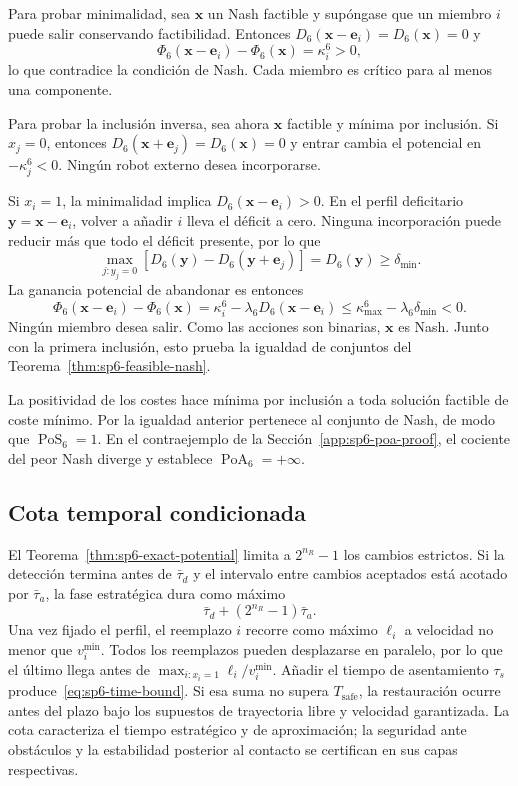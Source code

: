 Para probar minimalidad, sea $\boldsymbol x$ un Nash factible y supóngase que un miembro $i$ puede salir conservando factibilidad. Entonces
$D_6(\boldsymbol x-\boldsymbol e_i)=D_6(\boldsymbol x)=0$ y
\[
 \Phi_6(\boldsymbol x-\boldsymbol e_i)-\Phi_6(\boldsymbol x)=\kappa_i^6>0,
\]
lo que contradice la condición de Nash. Cada miembro es crítico para al menos una componente.

Para probar la inclusión inversa, sea ahora $\boldsymbol x$ factible y mínima por inclusión. Si $x_j=0$, entonces $D_6(\boldsymbol x+\boldsymbol e_j)=D_6(\boldsymbol x)=0$ y entrar cambia el potencial en $-\kappa_j^6<0$. Ningún robot externo desea incorporarse.

Si $x_i=1$, la minimalidad implica $D_6(\boldsymbol x-\boldsymbol e_i)>0$. En el perfil deficitario $\boldsymbol y=\boldsymbol x-\boldsymbol e_i$, volver a añadir $i$ lleva el déficit a cero. Ninguna incorporación puede reducir más que todo el déficit presente, por lo que
\[
 \max_{j:y_j=0}\left[D_6(\boldsymbol y)-D_6(\boldsymbol y+\boldsymbol e_j)\right]
 =D_6(\boldsymbol y)\geq\delta_{\min}.
\]
La ganancia potencial de abandonar es entonces
\[
 \Phi_6(\boldsymbol x-\boldsymbol e_i)-\Phi_6(\boldsymbol x)
 =\kappa_i^6-\lambda_6D_6(\boldsymbol x-\boldsymbol e_i)
 \leq\kappa_{\max}^6-\lambda_6\delta_{\min}<0.
\]
Ningún miembro desea salir. Como las acciones son binarias, $\boldsymbol x$ es Nash. Junto con la primera inclusión, esto prueba la igualdad de conjuntos del Teorema~\ref{thm:sp6-feasible-nash}.

La positividad de los costes hace mínima por inclusión a toda solución factible de coste mínimo. Por la igualdad anterior pertenece al conjunto de Nash, de modo que $\operatorname{PoS}_6=1$. En el contraejemplo de la Sección~\ref{app:sp6-poa-proof}, el cociente del peor Nash diverge y establece $\operatorname{PoA}_6=+\infty$.

\subsection{Cota temporal condicionada}
\label{app:sp6-time-proof}

El Teorema~\ref{thm:sp6-exact-potential} limita a $2^{n_R}-1$ los cambios estrictos. Si la detección termina antes de $\bar\tau_d$ y el intervalo entre cambios aceptados está acotado por $\bar\tau_a$, la fase estratégica dura como máximo
\[
 \bar\tau_d+(2^{n_R}-1)\bar\tau_a.
\]
Una vez fijado el perfil, el reemplazo $i$ recorre como máximo $\ell_i$ a velocidad no menor que $v_i^{\min}$. Todos los reemplazos pueden desplazarse en paralelo, por lo que el último llega antes de
$\max_{i:x_i=1}\ell_i/v_i^{\min}$. Añadir el tiempo de asentamiento $\tau_s$ produce~\eqref{eq:sp6-time-bound}. Si esa suma no supera $T_{\mathrm{safe}}$, la restauración ocurre antes del plazo bajo los supuestos de trayectoria libre y velocidad garantizada. La cota caracteriza el tiempo estratégico y de aproximación; la seguridad ante obstáculos y la estabilidad posterior al contacto se certifican en sus capas respectivas.

